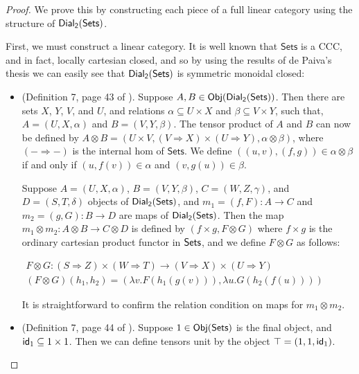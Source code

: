\begin{proof}
  We prove this by constructing each piece of a full linear category
  using the structure of $\mathsf{Dial_2}(\mathsf{Sets})$.

  First, we must construct a linear category. It is well known that
  $\mathsf{Sets}$ is a CCC, and in fact, locally cartesian closed, and
  so by using the results of de Paiva's thesis we can easily see that
  $\mathsf{Dial_2}(\mathsf{Sets})$ is symmetric monoidal closed:
  \begin{center}
    \begin{itemize}
    \item (Definition 7, page 43 of \cite{dePaiva:1988}). Suppose
      $A,B \in \mathsf{Obj}(\mathsf{Dial_2}(\mathsf{Sets}))$.  Then there are sets $X$, $Y$, $V$, and
      $U$, and relations $\alpha \subseteq U \times X$ and
      $\beta \subseteq V \times Y$, such that, $A = (U,X,\alpha)$ and
      $B = (V,Y,\beta)$.  The tensor product of $A$ and $B$ can now be
      defined by $A \otimes B = (U \times V, (V \Rightarrow X) \times
      (U \Rightarrow Y),\alpha \otimes \beta)$, where $(- \Rightarrow
      -)$ is the internal hom of $\mathsf{Sets}$.  We define
      $((u,v),(f,g)) \in \alpha \otimes \beta$ if and only if
      $(u,f(v)) \in \alpha$ and $(v,g(u)) \in \beta$.  

      Suppose $A = (U,X,\alpha)$, $B = (V,Y,\beta)$,
      $C = (W,Z,\gamma)$, and $D = (S,T,\delta)$ objects of $\mathsf{Dial_2}(\mathsf{Sets})$,
      and $m_1 = (f, F) : A \to C$ and $m_2 = (g,G) : B \to D$ are
      maps of $\mathsf{Dial_2}(\mathsf{Sets})$.  Then the map $m_1 \otimes m_2 : A \otimes B
      \to C \otimes D$ is defined by $(f \times g, F \otimes G)$ where
      $f \times g$ is the ordinary cartesian product functor in
      $\mathsf{Sets}$, and we define $F \otimes G$ as follows:
      \begin{center}
        \begin{math}
          \begin{array}{lll}
            F \otimes G : (S \Rightarrow Z) \times (W \Rightarrow T) \to (V \Rightarrow X) \times (U \Rightarrow Y)\\
            (F \otimes G)(h_1,h_2) = (\lambda v.F(h_1(g(v))),\lambda u.G(h_2(f(u))))
          \end{array}
        \end{math}
      \end{center}
      It is straightforward to confirm the relation condition on maps
      for $m_1 \otimes m_2$.

    \item (Definition 7, page 44 of \cite{dePaiva:1988}). Suppose
      $1 \in \mathsf{Obj}(\mathsf{Sets})$ is the final object, and
      $\mathsf{id}_1 \subseteq 1 \times 1$.  Then we can define tensors
      unit by the object $\top = (1,1,\mathsf{id}_1)$.


\end{itemize}
\end{center}
\end{proof}
